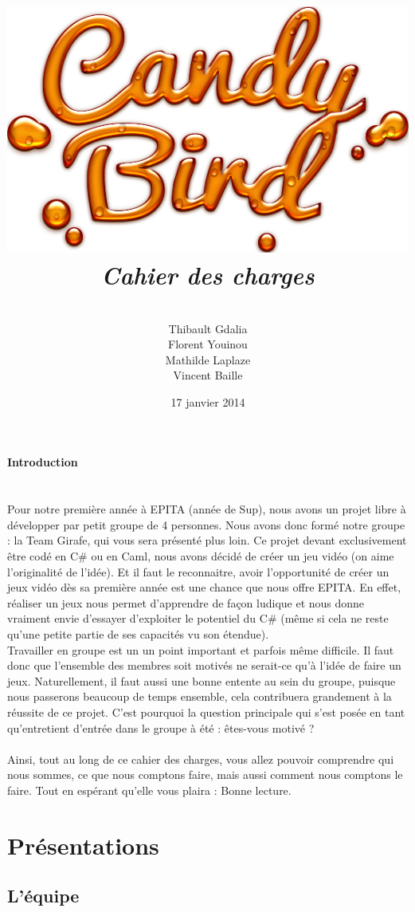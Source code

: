 \documentclass [11pt]{report}
\title{
	\includegraphics[scale=0.43]{images/Logojeu.png}
	 \\\vspace{20mm}
	\textbf{\Huge \itshape Cahier des charges }
	}
\author{ \\\vspace{2mm}
	Thibault Gdalia\\\vspace{2mm}
	Florent Youinou\\\vspace{2mm}
	Mathilde Laplaze\\\vspace{2mm}
	Vincent Baille \\\vspace{30mm}
	}
\date{17 janvier 2014}
\begin{document}
\renewcommand{\baselinestretch}{0.001}
\maketitle
\tableofcontents

\newpage


\textbf{{\Huge Introduction}}\\
\\
\\
		\indent Pour notre première année à EPITA (année de Sup), nous avons un projet libre à développer par petit groupe de 4 personnes. Nous avons donc formé notre groupe : la Team Girafe, qui vous sera présenté plus loin. Ce projet devant exclusivement être codé en C\# ou en Caml, nous avons décidé de créer un jeu vidéo (on 		aime l'originalité de l'idée). Et il faut le reconnaitre, avoir l'opportunité de créer un jeux vidéo dès sa première année est une chance que nous offre EPITA. En effet, réaliser un jeux nous permet d'apprendre de façon ludique et nous donne vraiment envie d'essayer d'exploiter le potentiel du C\# (même si cela ne reste qu'une petite partie 		de ses capacités vu son étendue).\\

		\indent Travailler en groupe est un un point important et parfois même difficile. Il faut donc que l'ensemble des membres soit motivés ne serait-ce qu'à l'idée de faire un jeux. Naturellement, il faut aussi une bonne entente au sein du groupe, puisque nous passerons beaucoup de temps ensemble, cela contribuera grandement à la 			réussite de ce projet. C'est pourquoi la question principale qui s'est posée en tant qu'entretient d'entrée dans le groupe à été : êtes-vous motivé ?\\\\
		\indent Ainsi, tout au long de ce cahier des charges, vous allez pouvoir comprendre qui nous sommes, ce que nous comptons faire, mais aussi comment nous comptons le faire. Tout en espérant qu'elle vous plaira : Bonne lecture.
		
\chapter {Pr\'esentations}

	\section{ L'\'equipe }
\end{document}
